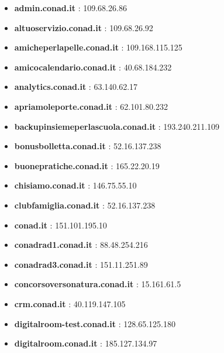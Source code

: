 \documentclass{article}
\begin{document}
\begin{itemize}
    
        \item \textbf{ admin.conad.it }: 109.68.26.86
    
        \item \textbf{ altuoservizio.conad.it }: 109.68.26.92
    
        \item \textbf{ amicheperlapelle.conad.it }: 109.168.115.125
    
        \item \textbf{ amicocalendario.conad.it }: 40.68.184.232
    
        \item \textbf{ analytics.conad.it }: 63.140.62.17
    
        \item \textbf{ apriamoleporte.conad.it }: 62.101.80.232
    
        \item \textbf{ backupinsiemeperlascuola.conad.it }: 193.240.211.109
    
        \item \textbf{ bonusbolletta.conad.it }: 52.16.137.238
    
        \item \textbf{ buonepratiche.conad.it }: 165.22.20.19
    
        \item \textbf{ chisiamo.conad.it }: 146.75.55.10
    
        \item \textbf{ clubfamiglia.conad.it }: 52.16.137.238
    
        \item \textbf{ conad.it }: 151.101.195.10
    
        \item \textbf{ conadrad1.conad.it }: 88.48.254.216
    
        \item \textbf{ conadrad3.conad.it }: 151.11.251.89
    
        \item \textbf{ concorsoversonatura.conad.it }: 15.161.61.5
    
        \item \textbf{ crm.conad.it }: 40.119.147.105
    
        \item \textbf{ digitalroom-test.conad.it }: 128.65.125.180
    
        \item \textbf{ digitalroom.conad.it }: 185.127.134.97
    

\end{itemize}
\end{document}
